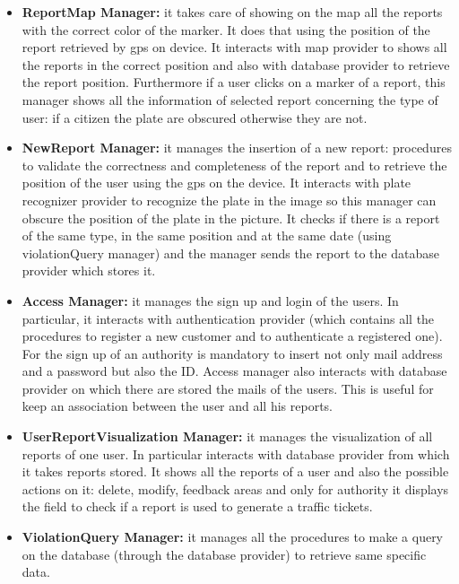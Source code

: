 \documentclass[../RASD.tex]{subfiles}
\begin{document}
    \begin{itemize}
        \item \textbf{ReportMap Manager:} it takes care of showing on the map all the reports with the correct color of the marker.
        It does that using the position of the report retrieved by gps on device.
        It interacts with map provider to shows all the reports in the correct position and also with database provider to retrieve the report position.
        Furthermore if a user clicks on a marker of a report, this manager shows all the information of selected report concerning the type of user:
        if a citizen the plate are obscured otherwise they are not.
        \item \textbf{NewReport Manager:} it manages the insertion of a new report: procedures to validate the correctness and completeness of the report
        and to retrieve the position of the user using the gps on the device.
        It interacts with plate recognizer provider to recognize the plate in the image so this manager can obscure the position of the plate in the picture.
        It checks if there is a report of the same type, in the same position and at the same date (using violationQuery manager)
        and the manager sends the report to the database provider which stores it.
        \item \textbf{Access Manager:} it manages the sign up and login of the users.
        In particular, it interacts with authentication provider (which contains all the procedures to register a new customer and to authenticate a registered one).
        For the sign up of an authority is mandatory to insert not only mail address and a password but also the ID\@.
        Access manager also interacts with database provider on which there are stored the mails of the users.
        This is useful for keep an association between the user and all his reports.
        \item \textbf{UserReportVisualization Manager:} it manages the visualization of all reports of one user.
        In particular interacts with database provider from which it takes reports stored.
        It shows all the reports of a user and also the possible actions on it: delete, modify, feedback areas and only for authority
        it displays the field to check if a report is used to generate a traffic tickets.
        \item \textbf{ViolationQuery Manager:} it manages all the procedures to make a query on the database (through the database provider)
        to retrieve same specific data.

\end{itemize}
\end{document}
